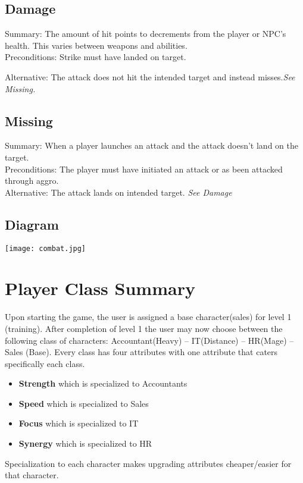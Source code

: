 \documentclass[12pt]{report}
\begin{document}
    \section{Damage}
    Summary: The amount of hit points to decrements from the player or NPC's health. This varies between weapons and abilities.\\
    
    Preconditions: Strike must have landed on target.
    
    Alternative: The attack does not hit the intended target and instead misses.\textit{See Missing.}
    
    \section{Missing}
    Summary: When a player launches an attack and the attack doesn't land on the target.\\
    
    Preconditions: The player must have initiated an attack or as been attacked through aggro.\\
    Alternative: The attack lands on intended target. \textit{See Damage}

    \section{Diagram}
    \texttt{[image: combat.jpg]}
\chapter{Player Class Summary}
 Upon starting the game, the user is assigned a base character(sales) for level 1 (training). After completion of level 1 the user may now choose between the following class of characters: Accountant(Heavy) -- IT(Distance) -- HR(Mage) -- Sales (Base).  Every class has four attributes with one attribute that caters specifically each class.\\ 
\begin{itemize}
\item \textbf{Strength} which is specialized to Accountants\\ 
\item \textbf{Speed} which is specialized to Sales\\ 
\item \textbf{Focus} which is specialized to IT\\ 
\item \textbf{Synergy} which is specialized to HR\\  
\end{itemize}
Specialization to each character makes upgrading attributes cheaper/easier for that character.\\
\end{document}
